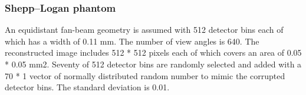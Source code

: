 \documentclass[hyperref]{ctexart}
\begin{document}
{\begin{multicols}{2}
		\subsubsection{Shepp–Logan phantom}
		An equidistant fan-beam geometry is assumed with 512 detector bins each of which has a width of 0.11 mm. The number of view angles is 640. The reconstructed image includes 512 * 512 pixels each of which covers an area of 0.05 * 0.05 mm2. Seventy of 512 detector bins are randomly selected and added with a 70 * 1 vector of normally distributed random number to mimic the corrupted detector bins. The standard deviation is 0.01.
		
		
	\end{multicols}
	
			\begin{figure}[htbp]
				\centering
				\quad
				\quad
				\subfigure[pic3.]{
}
\end{figure}}
\end{document}
